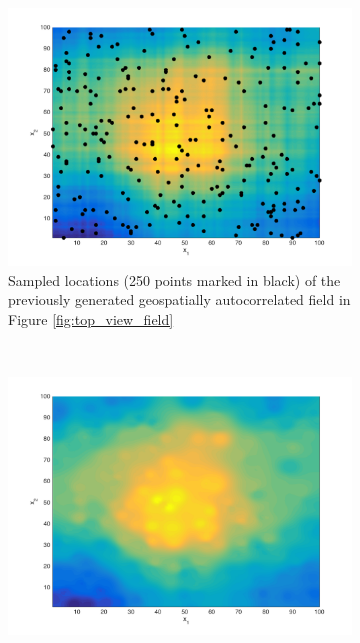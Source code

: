\documentclass[11pt]{ucthesis}
\begin{document}
\begin{figure}[ht!]
    \centering
    \begin{subfigure}[t]{0.5\textwidth}
        \centering
        \includegraphics[width=\linewidth]{figures/sampled_generated_field.png}
        \captionsetup{skip=0.5\baselineskip, width=0.8\textwidth, size=footnotesize}
        \caption{Sampled locations (250 points marked in black) of the previously generated geospatially autocorrelated field in Figure \ref{fig:top_view_field}}
        \label{fig:samples}
    \end{subfigure}%
    ~ 
    \begin{subfigure}[t]{0.5\textwidth}
        \centering
        \includegraphics[width=\linewidth]{figures/idw_predicted_field.png}

\end{subfigure}
\end{figure}
\end{document}
